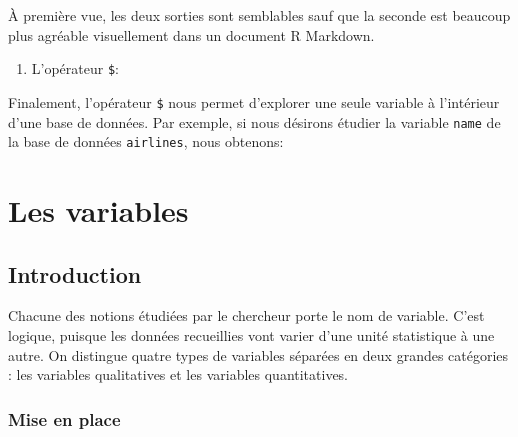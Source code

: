 \documentclass[]{book}
\newenvironment{Shaded}{\begin{snugshade}}{\end{snugshade}}
\newcommand{\NormalTok}[1]{#1}
\newcommand{\OperatorTok}[1]{\textcolor[rgb]{0.81,0.36,0.00}{\textbf{#1}}}
\providecommand{\tightlist}{%
  \setlength{\itemsep}{0pt}\setlength{\parskip}{0pt}}
\theoremstyle{definition}
\theoremstyle{definition}
\theoremstyle{definition}
\theoremstyle{remark}
\begin{document}
À première vue, les deux sorties sont semblables sauf que la seconde est
beaucoup plus agréable visuellement dans un document R Markdown.

\begin{enumerate}
\def\labelenumi{\arabic{enumi}.}
\setcounter{enumi}{3}
\tightlist
\item
  L'opérateur \texttt{\$}:
\end{enumerate}

Finalement, l'opérateur \texttt{\$} nous permet d'explorer une seule
variable à l'intérieur d'une base de données. Par exemple, si nous
désirons étudier la variable \texttt{name} de la base de données
\texttt{airlines}, nous obtenons:

\begin{Shaded}
\end{Shaded}

\hypertarget{variables}{%
\chapter{Les variables}\label{variables}}

\hypertarget{introduction-1}{%
\section{Introduction}\label{introduction-1}}

Chacune des notions étudiées par le chercheur porte le nom de variable.
C'est logique, puisque les données recueillies vont varier d'une unité
statistique à une autre. On distingue quatre types de variables séparées
en deux grandes catégories : les variables qualitatives et les variables
quantitatives.

\hypertarget{mise-en-place}{%
\subsection{Mise en place}\label{mise-en-place}}
\end{document}
